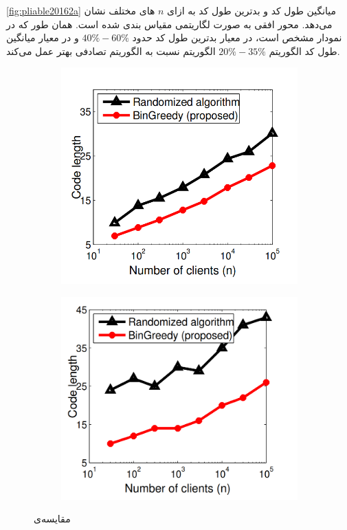 \autoref{fig:pliable20162a}
میانگین طول کد و بدترین طول کد به ازای
$n$
های مختلف نشان می‌دهد. محور افقی به صورت لگاریتمی مقیاس بندی شده است. همان طور که در نمودار مشخص است، در معیار بدترین طول کد حدود
$40\%-60\%$
و در معیار میانگین طول کد الگوریتم
$20\%-35\%$
الگوریتم
نسبت به الگوریتم تصادفی بهتر عمل می‌کند.
  \begin{figure}
	\centering
	\begin{subfigure}[b]{0.45\textwidth}
		\centering
			\includegraphics[width=1\linewidth]{figs/ch3/pliable2016_2a}
			\caption{}
			\label{fig:pliable20162a}
		\end{subfigure}
		\hfill
	\begin{subfigure}[b]{0.45\textwidth}
	\centering
	\includegraphics[width=1\linewidth]{figs/ch3/pliable2016_2b}
	\caption{
	}
	\label{fig:pliable20162b}
		\end{subfigure}
		\caption{
			مقایسه‌ی
			}
\end{figure}

